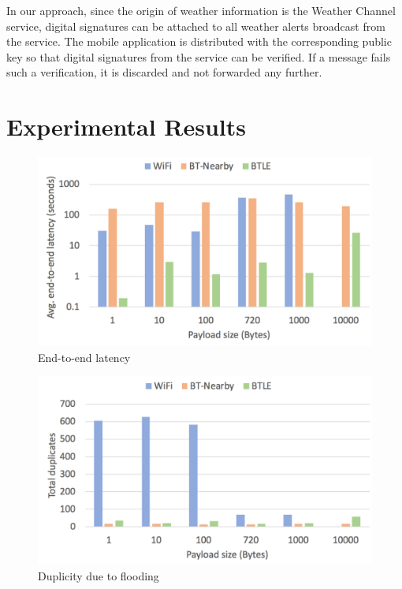 \documentclass[conference]{IEEEtran}
\begin{document}
In our approach, since the origin of weather information is the
Weather Channel service, digital signatures can be attached to all
weather alerts broadcast from the service. The mobile application is
distributed with the corresponding public key so that digital
signatures from the service can be verified. If a message fails such a
verification, it is discarded and not forwarded any further.
\section{Experimental Results}
\label{sec:eval}

\begin{figure}[htbp]
\centerline{\includegraphics[width=\columnwidth]{figs/e2e_latency}}
\caption{End-to-end latency}
\label{fig:e2e}
\end{figure}

\begin{figure}[htbp]
\centerline{\includegraphics[width=\columnwidth]{figs/duplicates}}
\caption{Duplicity due to flooding}
\label{fig:dup}
\end{figure}
\end{document}
